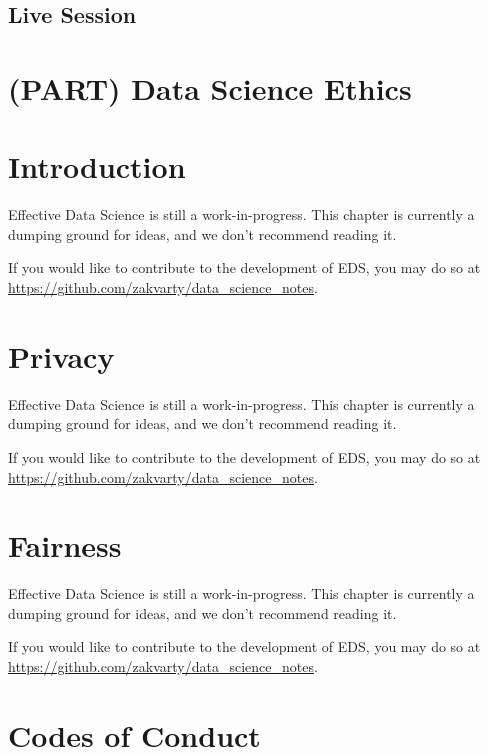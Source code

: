 \documentclass[
  12pt,
]{book}
\begin{document}
\hypertarget{live-session-3}{%
\section{Live Session}\label{live-session-3}}

\hypertarget{part-data-science-ethics}{%
\chapter{(PART) Data Science Ethics}\label{part-data-science-ethics}}

\hypertarget{ethics-introduction}{%
\chapter*{Introduction}\label{ethics-introduction}}

Effective Data Science is still a work-in-progress. This chapter is currently a dumping ground for ideas, and we don't recommend reading it.

If you would like to contribute to the development of EDS, you may do so at \url{https://github.com/zakvarty/data_science_notes}.

\hypertarget{ethics-privacy}{%
\chapter{Privacy}\label{ethics-privacy}}

Effective Data Science is still a work-in-progress. This chapter is currently a dumping ground for ideas, and we don't recommend reading it.

If you would like to contribute to the development of EDS, you may do so at \url{https://github.com/zakvarty/data_science_notes}.

\hypertarget{ethics-fairness}{%
\chapter{Fairness}\label{ethics-fairness}}

Effective Data Science is still a work-in-progress. This chapter is currently a dumping ground for ideas, and we don't recommend reading it.

If you would like to contribute to the development of EDS, you may do so at \url{https://github.com/zakvarty/data_science_notes}.

\hypertarget{ethics-conduct}{%
\chapter{Codes of Conduct}\label{ethics-conduct}}
\end{document}
